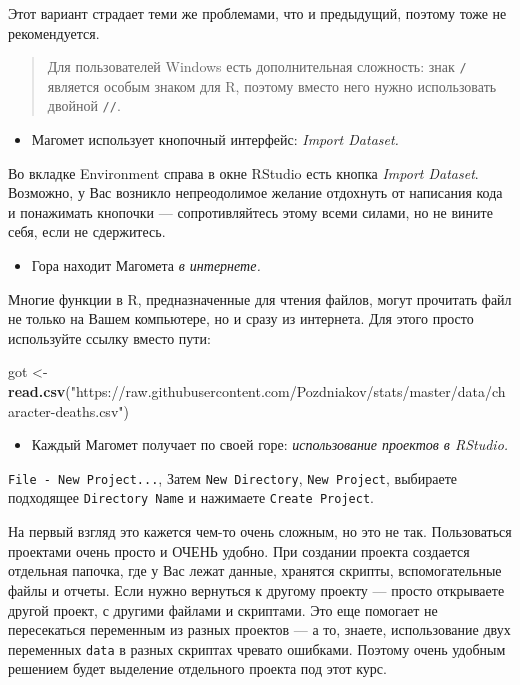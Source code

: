 \documentclass[]{book}
\newenvironment{Shaded}{\begin{snugshade}}{\end{snugshade}}
\newcommand{\KeywordTok}[1]{\textcolor[rgb]{0.13,0.29,0.53}{\textbf{#1}}}
\newcommand{\StringTok}[1]{\textcolor[rgb]{0.31,0.60,0.02}{#1}}
\newcommand{\NormalTok}[1]{#1}
\providecommand{\tightlist}{%
  \setlength{\itemsep}{0pt}\setlength{\parskip}{0pt}}
\begin{document}
Этот вариант страдает теми же проблемами, что и предыдущий, поэтому тоже
не рекомендуется.

\begin{quote}
Для пользователей Windows есть дополнительная сложность: знак \texttt{/}
является особым знаком для R, поэтому вместо него нужно использовать
двойной \texttt{//}.
\end{quote}

\begin{itemize}
\tightlist
\item
  Магомет использует кнопочный интерфейс: \emph{Import Dataset.}
\end{itemize}

Во вкладке Environment справа в окне RStudio есть кнопка \emph{Import
Dataset}. Возможно, у Вас возникло непреодолимое желание отдохнуть от
написания кода и понажимать кнопочки --- сопротивляйтесь этому всеми
силами, но не вините себя, если не сдержитесь.

\begin{itemize}
\tightlist
\item
  Гора находит Магомета \emph{в интернете.}
\end{itemize}

Многие функции в R, предназначенные для чтения файлов, могут прочитать
файл не только на Вашем компьютере, но и сразу из интернета. Для этого
просто используйте ссылку вместо пути:

\begin{Shaded}
\begin{Highlighting}[]
\NormalTok{got <-}\StringTok{ }\KeywordTok{read.csv}\NormalTok{(}\StringTok{"https://raw.githubusercontent.com/Pozdniakov/stats/master/data/character-deaths.csv"}\NormalTok{)}
\end{Highlighting}
\end{Shaded}

\begin{itemize}
\tightlist
\item
  Каждый Магомет получает по своей горе: \emph{использование проектов в
  RStudio.}
\end{itemize}

\texttt{File\ -\ New\ Project...}, Затем \texttt{New\ Directory},
\texttt{New\ Project}, выбираете подходящее \texttt{Directory\ Name} и
нажимаете \texttt{Create\ Project}.

На первый взгляд это кажется чем-то очень сложным, но это не так.
Пользоваться проектами очень просто и ОЧЕНЬ удобно. При создании проекта
создается отдельная папочка, где у Вас лежат данные, хранятся скрипты,
вспомогательные файлы и отчеты. Если нужно вернуться к другому проекту
--- просто открываете другой проект, с другими файлами и скриптами. Это
еще помогает не пересекаться переменным из разных проектов --- а то,
знаете, использование двух переменных \texttt{data} в разных скриптах
чревато ошибками. Поэтому очень удобным решением будет выделение
отдельного проекта под этот курс.
\end{document}
